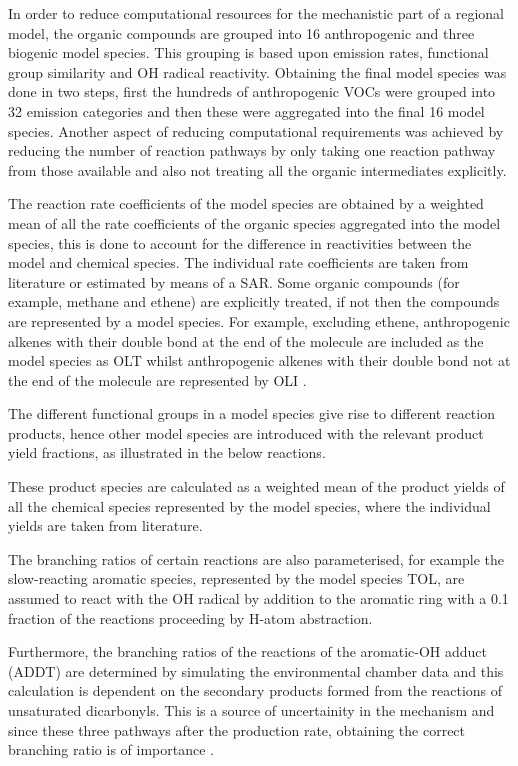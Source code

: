 In order to reduce computational resources for the mechanistic part of a regional model, the organic compounds are grouped into 16 anthropogenic and three biogenic model species. 
This grouping is based upon emission rates, functional group similarity and OH radical reactivity. 
Obtaining the final model species was done in two steps, first the hundreds of anthropogenic VOCs were grouped into 32 emission categories and then these were aggregated into the final 16 model species. 
Another aspect of reducing computational requirements was achieved by reducing the number of reaction pathways by only taking one reaction pathway from those available and also not treating all the organic intermediates explicitly.

The reaction rate coefficients of the model species are obtained by a weighted mean of all the rate coefficients of the organic species aggregated into the model species, this is done to account for the difference in reactivities between the model and chemical species. 
The individual rate coefficients are taken from literature or estimated by means of a SAR. 
Some organic compounds (for example, methane and ethene) are explicitly treated, if not then the compounds are represented by a model species. 
For example, excluding ethene, anthropogenic alkenes with their double bond at the end of the molecule are included as the model species as OLT whilst anthropogenic alkenes with their double bond not at the end of the molecule are represented by OLI \citep{Stockwell:1997}.

The different functional groups in a model species give rise to different reaction products, hence other model species are introduced with the relevant product yield fractions, as illustrated in the below reactions.
\begin{reactionlist}
\end{reactionlist}
These product species are calculated as a weighted mean of the product yields of all the chemical species represented by the model species, where the individual yields are taken from literature. 

The branching ratios of certain reactions are also parameterised, for example the slow-reacting aromatic species, represented by the model species TOL, are assumed to react with the OH radical by addition to the aromatic ring with a 0.1 fraction of the reactions proceeding by H-atom abstraction.
\begin{reactionlist}
\end{reactionlist}
Furthermore, the branching ratios of the reactions of the aromatic-OH adduct (ADDT) are determined by simulating the environmental chamber data and this calculation is dependent on the secondary products formed from the reactions of unsaturated dicarbonyls. 
This is a source of uncertainity in the mechanism and since these three pathways after the  production rate, obtaining the correct branching ratio is of importance \citep{Stockwell:1997}.

